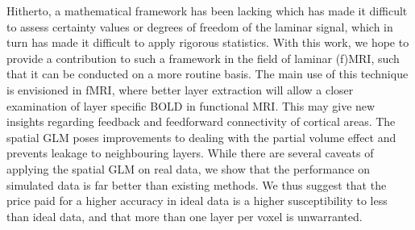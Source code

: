 Hitherto, a mathematical framework has been lacking which has made it difficult to assess certainty values or degrees of freedom of the laminar signal, which in turn has made it difficult to apply rigorous statistics. With this work, we hope to provide a contribution to such a framework in the field of laminar (f)MRI, such that it can be conducted on a more routine basis. The main use of this technique is envisioned in fMRI, where better layer extraction will allow a closer examination of layer specific BOLD in functional MRI. This may give new insights regarding feedback and feedforward connectivity of cortical areas.  The spatial GLM poses improvements to dealing with the partial volume effect and prevents leakage to neighbouring layers. While there are several caveats of applying the spatial GLM on real data, we show that the performance on simulated data is far better than existing methods. We thus suggest that the price paid for a higher accuracy in ideal data is a higher susceptibility to less than ideal data, and that more than one layer per voxel is unwarranted.

